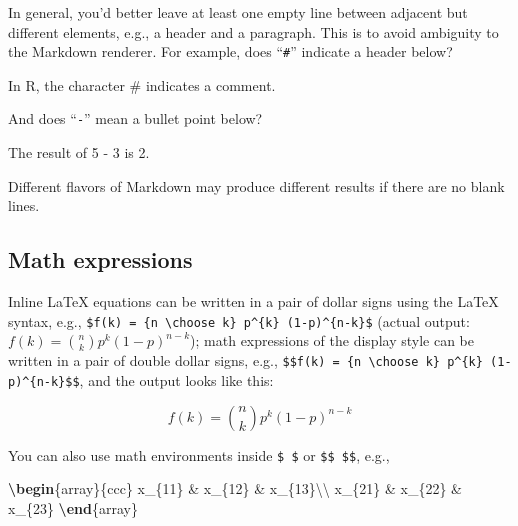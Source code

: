 \documentclass[
]{book}
\newenvironment{Shaded}{\begin{snugshade}}{\end{snugshade}}
\newcommand{\ExtensionTok}[1]{#1}
\newcommand{\FunctionTok}[1]{\textcolor[rgb]{0.00,0.00,0.00}{#1}}
\newcommand{\KeywordTok}[1]{\textcolor[rgb]{0.13,0.29,0.53}{\textbf{#1}}}
\newcommand{\NormalTok}[1]{#1}
\newcommand{\SpecialCharTok}[1]{\textcolor[rgb]{0.00,0.00,0.00}{#1}}
\newcommand{\SpecialStringTok}[1]{\textcolor[rgb]{0.31,0.60,0.02}{#1}}
\begin{document}
In general, you'd better leave at least one empty line between adjacent
but different elements, e.g., a header and a paragraph. This is to avoid
ambiguity to the Markdown renderer. For example, does ``\texttt{\#}'' indicate a
header below?

\begin{Shaded}
\begin{Highlighting}[]
\NormalTok{In R, the character}
\FunctionTok{\# indicates a comment.}
\end{Highlighting}
\end{Shaded}

And does ``\texttt{-}'' mean a bullet point below?

\begin{Shaded}
\begin{Highlighting}[]
\NormalTok{The result of 5}
\SpecialStringTok{{-} }\NormalTok{3 is 2.}
\end{Highlighting}
\end{Shaded}

Different flavors of Markdown may produce different results if there are
no blank lines.

\hypertarget{math-expressions}{%
\subsection{Math expressions}\label{math-expressions}}

Inline LaTeX equations can be written in a pair of
dollar signs using the LaTeX syntax, e.g.,
\texttt{\$f(k)\ =\ \{n\ \textbackslash{}choose\ k\}\ p\^{}\{k\}\ (1-p)\^{}\{n-k\}\$} (actual output:
\(f(k)={n \choose k}p^{k}(1-p)^{n-k}\)); math expressions of the display
style can be written in a pair of double dollar signs, e.g.,
\texttt{\$\$f(k)\ =\ \{n\ \textbackslash{}choose\ k\}\ p\^{}\{k\}\ (1-p)\^{}\{n-k\}\$\$}, and the output looks like
this:

\[f\left(k\right)=\binom{n}{k}p^k\left(1-p\right)^{n-k}\]

You can also use math environments inside \texttt{\$\ \$} or \texttt{\$\$\ \$\$}, e.g.,

\begin{Shaded}
\begin{Highlighting}[]
\SpecialStringTok{$$}\KeywordTok{\textbackslash{}begin}\NormalTok{\{}\ExtensionTok{array}\NormalTok{\}}\SpecialStringTok{\{ccc\}}
\SpecialStringTok{x\_\{11\} \& x\_\{12\} \& x\_\{13\}}\SpecialCharTok{\textbackslash{}\textbackslash{}}
\SpecialStringTok{x\_\{21\} \& x\_\{22\} \& x\_\{23\}}
\KeywordTok{\textbackslash{}end}\NormalTok{\{}\ExtensionTok{array}\NormalTok{\}}\SpecialStringTok{$$}
\end{Highlighting}
\end{Shaded}
\end{document}
